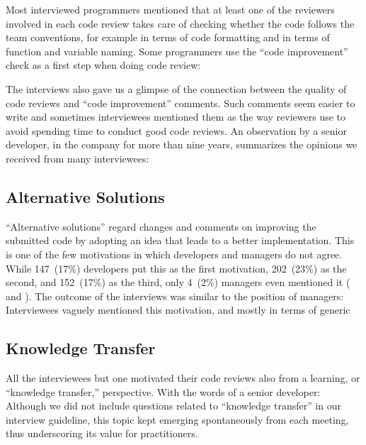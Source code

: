 Most interviewed programmers mentioned that at least one of the reviewers
involved in each code review takes care of checking whether the code follows
the team conventions, for example in terms of code formatting and in terms of
function and variable naming. Some programmers use the ``code improvement''
check as a first step when doing code review: 

The interviews also gave us a glimpse of the connection between the quality of
code reviews and ``code improvement'' comments. Such comments seem easier to
write and sometimes interviewees mentioned them as the way reviewers use to
avoid spending time to conduct good code reviews. An observation by a senior
developer, in the company for more than nine years, summarizes the opinions we
received from many interviewees: 

\subsection{Alternative Solutions}

``Alternative solutions'' regard changes and comments on improving the
submitted code by adopting an idea that leads to a better implementation. This
is one of the few motivations in which developers and managers do not agree.
While 147~(17\%) developers put this as the first motivation, 202~(23\%) as the
second, and 152~(17\%) as the third, only 4~(2\%) managers even mentioned it
(\eg {} and
). The outcome of the interviews was similar to the
position of managers: Interviewees vaguely mentioned this motivation, and
mostly in terms of generic 


\subsection{Knowledge Transfer}

All the interviewees but one motivated their code reviews also from a learning,
or ``knowledge transfer,'' perspective. With the words of a senior developer:
 Although we did not
include questions related to ``knowledge transfer'' in our interview guideline,
this topic kept emerging spontaneously from each meeting, thus underscoring its
value for practitioners.

